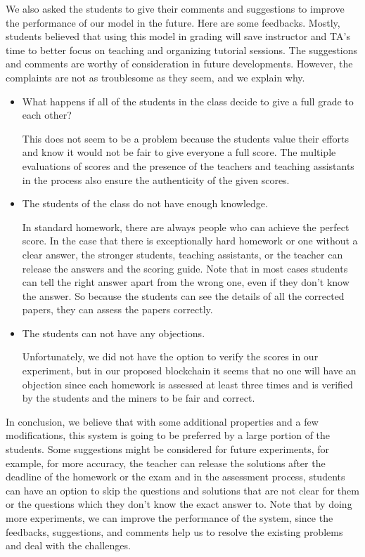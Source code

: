 \documentclass[manuscript,review,anonymous]{acmart}%
\begin{document}
We also asked the students to give their comments and suggestions to improve the performance of our model in the future.
Here are some feedbacks. 
Mostly, students believed that using this model in grading will save instructor and TA's time to better focus on teaching and organizing tutorial sessions.
The suggestions and comments are worthy of consideration in future developments. However, the complaints are not as troublesome as they seem, and we explain why.
\begin{itemize}
\item What happens if all of the students in the class decide to give a full grade to each other?

This does not seem to be a problem because the students value their efforts and know it would not be fair to give everyone a full score.
The multiple evaluations of scores and the presence of the teachers and teaching assistants in the process also ensure the authenticity of the given scores.

\item The students of the class do not have enough knowledge.

In standard homework, there are always people who can achieve the perfect score. 
In the case that there is exceptionally hard homework or one without a clear answer, the stronger students, teaching assistants, or the teacher can release the answers and the scoring guide.
Note that in most cases students can tell the right answer apart from the wrong one, even if they don't know the answer. So
because the students can see the details of all the corrected papers, they can assess the papers correctly.

\item The students can not have any objections.

Unfortunately, we did not have the option to verify the scores in our experiment, but in our proposed blockchain it seems that no one will have an objection since each homework is assessed at least three times and is verified by the students and the miners to be fair and correct.



\end{itemize} 
In conclusion, we believe that with some additional properties and a few modifications, this system is going to be preferred by a large portion of the students.
Some suggestions might be considered for future experiments, for example, for more accuracy, the teacher can release the solutions after the deadline of the homework or the exam and in the assessment process, students can have an option to skip the questions and solutions that are not clear for them or the questions which they don't know the exact answer to.
Note that by doing more experiments, we can improve the performance of the system, since the feedbacks, suggestions, and comments help us to resolve the existing problems and deal with the challenges.
\end{document}
